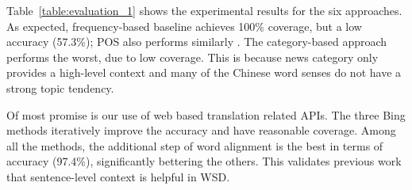 \begin{CJK}{UTF8}{gbsn}
Table~\ref{table:evaluation_1} shows the experimental results for the
six approaches.  As expected, frequency-based baseline achieves 100\%
coverage, but a low accuracy (57.3\%); POS also performs similarly
. The category-based approach performs the worst, due to low coverage.
This is because news category only provides a high-level context and
many of the Chinese word senses do not have a strong topic tendency.

Of most promise is our use of web based translation related APIs.  The
three Bing methods iteratively improve the accuracy and have
reasonable coverage. Among all the methods, the additional step of
word alignment is the best in terms of accuracy (97.4\%),
significantly bettering the others. This validates previous work that
sentence-level context is helpful in WSD.




\end{CJK}
